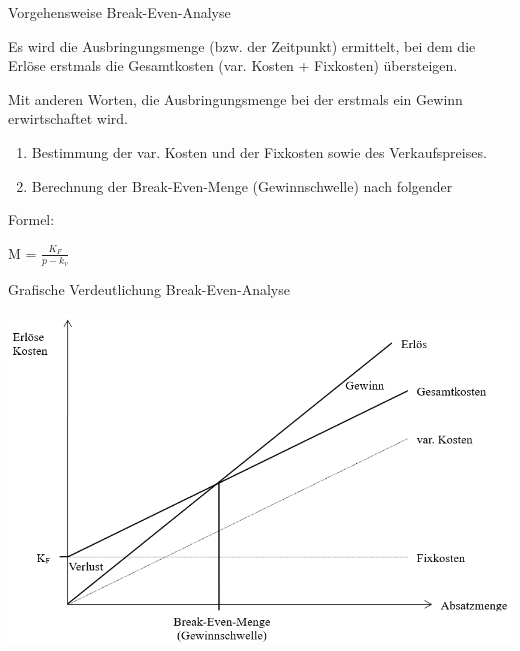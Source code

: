 \documentclass[12pt,ngerman,a4paper,ignorenonframetext,]{beamer}
\providecommand{\tightlist}{%
  \setlength{\itemsep}{0pt}\setlength{\parskip}{0pt}}
\begin{document}
\begin{frame}{Vorgehensweise Break-Even-Analyse}
\protect\hypertarget{vorgehensweise-break-even-analyse}{}

Es wird die Ausbringungsmenge (bzw. der Zeitpunkt) ermittelt, bei dem
die Erlöse erstmals die Gesamtkosten (var. Kosten + Fixkosten)
übersteigen.

Mit anderen Worten, die Ausbringungsmenge bei der erstmals ein Gewinn
erwirtschaftet wird.

\begin{enumerate}
\tightlist
\item
  Bestimmung der var. Kosten und der Fixkosten sowie des
  Verkaufspreises.
\item
  Berechnung der Break-Even-Menge (Gewinnschwelle) nach folgender
\end{enumerate}

Formel:

M = \(\frac{ K_{ F } }{ p-k_{ v } }\)

\end{frame}

\begin{frame}{Grafische Verdeutlichung Break-Even-Analyse}
\protect\hypertarget{grafische-verdeutlichung-break-even-analyse}{}

\begin{center}\includegraphics[width=0.7\linewidth]{./images/Marketingcontrolling/Breakeven} \end{center}

\end{frame}
\end{document}
